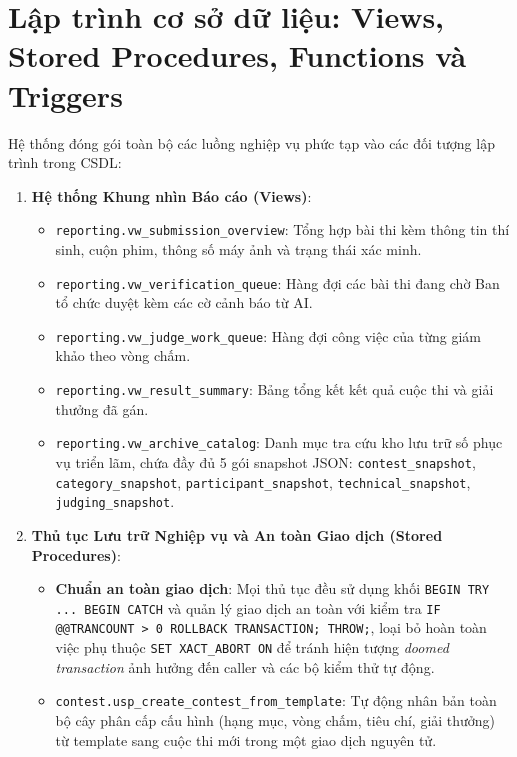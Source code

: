 \section{Lập trình cơ sở dữ liệu: Views, Stored Procedures, Functions và Triggers}
\label{s:c5_programmability}

Hệ thống đóng gói toàn bộ các luồng nghiệp vụ phức tạp vào các đối tượng lập trình trong CSDL:

\begin{enumerate}
    \item \textbf{Hệ thống Khung nhìn Báo cáo (Views)}:
    \begin{itemize}
        \item \texttt{reporting.vw\_submission\_overview}: Tổng hợp bài thi kèm thông tin thí sinh, cuộn phim, thông số máy ảnh và trạng thái xác minh.
        \item \texttt{reporting.vw\_verification\_queue}: Hàng đợi các bài thi đang chờ Ban tổ chức duyệt kèm các cờ cảnh báo từ AI.
        \item \texttt{reporting.vw\_judge\_work\_queue}: Hàng đợi công việc của từng giám khảo theo vòng chấm.
        \item \texttt{reporting.vw\_result\_summary}: Bảng tổng kết kết quả cuộc thi và giải thưởng đã gán.
        \item \texttt{reporting.vw\_archive\_catalog}: Danh mục tra cứu kho lưu trữ số phục vụ triển lãm, chứa đầy đủ 5 gói snapshot JSON: \texttt{contest\_snapshot}, \texttt{category\_snapshot}, \texttt{participant\_snapshot}, \texttt{technical\_snapshot}, \texttt{judging\_snapshot}.
    \end{itemize}
    \item \textbf{Thủ tục Lưu trữ Nghiệp vụ và An toàn Giao dịch (Stored Procedures)}:
    \begin{itemize}
        \item \textbf{Chuẩn an toàn giao dịch}: Mọi thủ tục đều sử dụng khối \texttt{BEGIN TRY ... BEGIN CATCH} và quản lý giao dịch an toàn với kiểm tra \texttt{IF @@TRANCOUNT > 0 ROLLBACK TRANSACTION; THROW;}, loại bỏ hoàn toàn việc phụ thuộc \texttt{SET XACT\_ABORT ON} để tránh hiện tượng \textit{doomed transaction} ảnh hưởng đến caller và các bộ kiểm thử tự động.
        \item \texttt{contest.usp\_create\_contest\_from\_template}: Tự động nhân bản toàn bộ cây phân cấp cấu hình (hạng mục, vòng chấm, tiêu chí, giải thưởng) từ template sang cuộc thi mới trong một giao dịch nguyên tử.

\end{itemize}
\end{enumerate}
